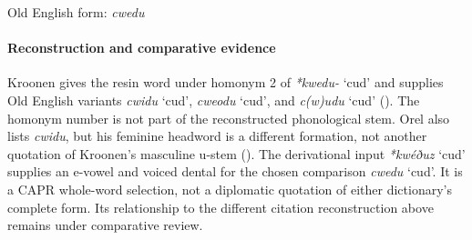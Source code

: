 \documentclass[
  british,
  a4paper,
]{article}
\providecommand{\Recon}[1]{\emph{*#1}}
\begin{document}
\noindent{} \endgroup

Old English form: \emph{cwedu}

\paragraph{Reconstruction and comparative
evidence}\label{reconstruction-and-comparative-evidence-85}

Kroonen gives the resin word under homonym 2 of \Recon{kwedu-} `cud' and
supplies Old English variants {\emph{cwidu}} `cud', {\emph{cweodu}}
`cud', and {\emph{c(w)udu}} `cud' (). The homonym number is not part of the reconstructed
phonological stem. Orel also lists {\emph{cwidu}}, but his feminine
headword is a different formation, not another quotation of Kroonen's
masculine u-stem (). The
derivational input \Recon{kwéðuz} `cud' supplies an e-vowel and voiced
dental for the chosen comparison {\emph{cwedu}} `cud'. It is a CAPR
whole-word selection, not a diplomatic quotation of either dictionary's
complete form. Its relationship to the different citation reconstruction
above remains under comparative review.
\end{document}
